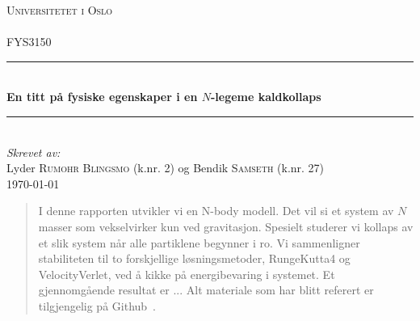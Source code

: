 \documentclass[11pt]{article}
\begin{document}
\begin{titlepage}
  \newcommand{\HRule}{\rule{\linewidth}{0.5mm}}
  \center
  \textsc{\LARGE Universitetet i Oslo}\\[1.5cm] %
  \textsc{\Large }\\[0.5cm] %
  \textsc{\large FYS3150}\\[0.5cm] %
  \HRule \\[0.4cm]
  { \huge \bfseries En titt på fysiske egenskaper
  i en $N$-legeme kaldkollaps}\\[0.4cm]
  \HRule \\[1.5cm]
  \Large \emph{Skrevet av:}\\
  Lyder \textsc{Rumohr Blingsmo} (k.nr. 2) og Bendik \textsc{Samseth} (k.nr. 27)\\[3cm]
  {\large \today}\\[3cm]
  \vfill
\end{titlepage}

\tableofcontents
\begin{abstract}
I denne rapporten utvikler vi en N-body modell. Det vil si et system av
$N$ masser som vekselvirker kun ved gravitasjon. Spesielt studerer vi kollaps
av et slik system når alle partiklene begynner i ro. Vi sammenligner 
stabiliteten til to forskjellige løsningsmetoder, RungeKutta4 og VelocityVerlet,
ved å kikke på energibevaring i systemet. Et gjennomgående resultat er ...
Alt materiale som har blitt referert er tilgjengelig
 på Github~\cite{github-repo}. 
\end{abstract}
\end{document}
